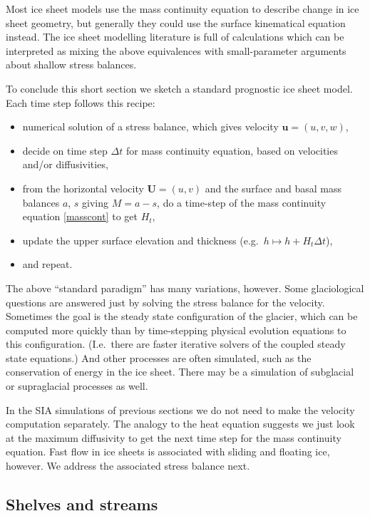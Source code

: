 \documentclass[titlepage,a4paper,final,12pt]{scrartcl}
\begin{document}
Most ice sheet models use the mass continuity equation to describe change in ice sheet geometry, but generally they could use the surface kinematical equation instead.  The ice sheet modelling literature is full of calculations which can be interpreted as mixing the above equivalences with small-parameter arguments about shallow stress balances.

To conclude this short section we sketch a standard prognostic ice sheet model.  Each time step follows this recipe:
  \begin{itemize}
  \item numerical solution of a stress balance, which gives velocity $\mathbf{u}=(u,v,w)$,
  \item decide on time step $\Delta t$ for mass continuity equation, based on velocities and/or diffusivities,
  \item from the horizontal velocity $\mathbf{U}=(u,v)$ and the surface and basal mass balances $a$, $s$ giving $M=a-s$, do a time-step of the mass continuity equation \eqref{masscont} to get $H_t$,
  \item update the upper surface elevation and thickness (e.g.~$h \mapsto h + H_t \Delta t$),
  \item and repeat.
  \end{itemize}

The above ``standard paradigm'' has many variations, however.  Some glaciological questions are answered just by solving the stress balance for the velocity.  Sometimes the goal is the steady state configuration of the glacier, which can be computed more quickly than by time-stepping physical evolution equations to this configuration.  (I.e.~there are faster iterative solvers of the coupled steady state equations.)  And other processes are often simulated, such as the conservation of energy in the ice sheet.  There may be a simulation of subglacial or supraglacial processes as well.

In the SIA simulations of previous sections we do not need to make the velocity computation separately.  The analogy to the heat equation suggests we just look at the maximum diffusivity to get the next time step for the mass continuity equation.  Fast flow in ice sheets is associated with sliding and floating ice, however.  We address the associated stress balance next.


\subsection{Shelves and streams} \label{sec:shelvesandstreams}
\end{document}

